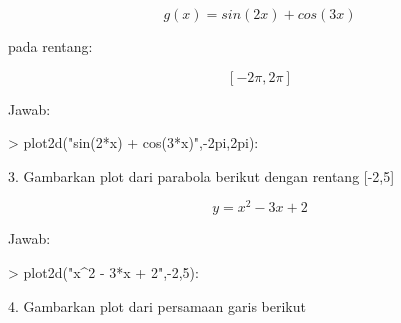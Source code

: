 \documentclass[a4paper,10pt]{article}
\begin{document}
\begin{eulernotebook}
\begin{eulercomment}
\begin{eulercomment}
\begin{eulercomment}
\begin{eulercomment}
\begin{eulercomment}
\begin{eulercomment}
\begin{eulercomment}
\begin{eulercomment}
\begin{eulercomment}
\end{eulercomment}
\begin{eulerformula}
\[
g(x) = sin(2x) + cos(3x)
\]
\end{eulerformula}
\begin{eulercomment}
\end{eulercomment}
\begin{eulerttcomment}
   pada rentang:
\end{eulerttcomment}
\begin{eulercomment}
\end{eulercomment}
\begin{eulerformula}
\[
[-2 \pi,2 \pi]
\]
\end{eulerformula}
\begin{eulercomment}
Jawab:
\end{eulercomment}
\begin{eulerprompt}
> plot2d("sin(2*x) + cos(3*x)",-2pi,2pi):
\end{eulerprompt}
\begin{eulercomment}
3. Gambarkan plot dari parabola berikut dengan rentang [-2,5]

\end{eulercomment}
\begin{eulerformula}
\[
y = x^2 - 3x + 2
\]
\end{eulerformula}
\begin{eulercomment}
Jawab:
\end{eulercomment}
\begin{eulerprompt}
> plot2d("x^2 - 3*x + 2",-2,5):
\end{eulerprompt}
\begin{eulercomment}
4. Gambarkan plot dari persamaan garis berikut


\end{eulercomment}
\end{eulercomment}
\end{eulercomment}
\end{eulercomment}
\end{eulercomment}
\end{eulercomment}
\end{eulercomment}
\end{eulercomment}
\end{eulercomment}
\end{eulernotebook}
\end{document}
